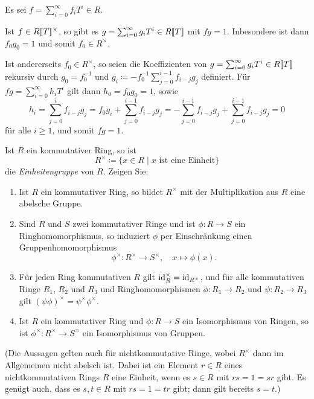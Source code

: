 \begin{solution}
  Es sei $f = \sum_{i=0}^\infty f_i T^i \in R$.
  
  Ist $f \in R[\![T]\!]^\times$, so gibt es $g = \sum_{i=0}^\infty g_i T^i \in R[\![T]\!]$ mit $fg = 1$.
  Inbesondere ist dann $f_0 g_0 = 1$ und somit $f_0 \in R^\times$.
  
  Ist andererseits $f_0 \in R^\times$, so seien die Koeffizienten von $g = \sum_{i=0}^\infty g_i T^i \in R[\![T]\!]$ rekursiv durch $g_0 = f_0^{-1}$ und $g_i \coloneqq - f_0^{-1} \sum_{j=0}^{i-1} f_{i-j} g_j$ definiert.
  Für $fg = \sum_{i=0}^\infty h_i T^i$ gilt dann $h_0 = f_0 g_0 = 1$, sowie
  \[
      h_i
    = \sum_{j=0}^i f_{i-j} g_j
    = f_0 g_i + \sum_{j=0}^{i-1} f_{i-j} g_j
    = - \sum_{j=0}^{i-1} f_{i-j} g_j + \sum_{j=0}^{i-1} f_{i-j} g_j
    = 0
  \]
  für alle $i \geq 1$, und somit $fg = 1$.
\end{solution}


\begin{question}[subtitle = Funktorialität der Einheitengruppe]
  Ist $R$ ein kommutativer Ring, so ist
  \[
              R^\times
    \coloneqq \{x \in R \mid \text{$x$ ist eine Einheit}\}
  \]
  die \emph{Einheitengruppe} von $R$.
  Zeigen Sie:
  \begin{enumerate}
    \item
      Ist $R$ ein kommutativer Ring, so bildet $R^\times$ mit der Multiplikation aus $R$ eine abelsche Gruppe.
    \item
      Sind $R$ und $S$ zwei kommutativer Ringe und ist $\phi \colon R \to S$ ein Ringhomomorphismus, so induziert $\phi$ per Einschränkung einen Gruppenhomomorphismus
      \[
        \phi^\times \colon R^\times \to S^\times,
        \quad
        x \mapsto \phi(x).
      \]
    \item
      Für jeden Ring kommutativen $R$ gilt $\operatorname{id}_R^\times = \operatorname{id}_{R^\times}$, und für alle kommutativen Ringe $R_1$, $R_2$ und $R_3$ und Ringhomomorphismen $\phi \colon R_1 \to R_2$ und $\psi \colon R_2 \to R_3$ gilt $(\psi \phi)^\times = \psi^\times \phi^\times$.
    \item
      Ist $R$ ein kommutativer Ring und $\phi \colon R \to S$ ein Isomorphismus von Ringen, so ist $\phi^\times \colon R^\times \to S^\times$ ein Isomorphismus von Gruppen.
  \end{enumerate}
  (Die Aussagen gelten auch für nichtkommutative Ringe, wobei $R^\times$ dann im Allgemeinen nicht abelsch ist.
   Dabei ist ein Element $r \in R$ eines nichtkommutativen Rings $R$ eine Einheit, wenn es $s \in R$ mit $rs = 1 = sr$ gibt.
   Es genügt auch, dass es $s, t \in R$ mit $rs = 1 = tr$ gibt; dann gilt bereits $s = t$.)
\end{question}


